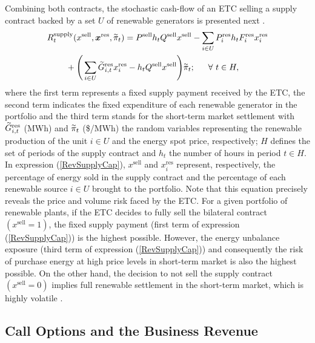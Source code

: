 	Combining both contracts, the stochastic cash-flow of an ETC selling a supply contract backed by a set $U$ of renewable generators is presented next \cite{RobustSpotPrice}.
%
\begin{align}
	& R^{\text{supply}}_{t}(x^{\text{sell}}, \boldsymbol{x}^{\text{res}}, \accentset{\sim}{\pi}_{t}) = P^{\text{sell}} h_{t} Q^{\text{sell}} x^{\text{sell}} - \sum_{i \in U} P_{i}^{\text{res}} h_{t} F_{i}^{\text{res}} x_{i}^{\text{res}} \notag \\
	 		& \> \> \> \> \> \> \> \> \> \> + \Bigg( \sum_{i \in U} \accentset{\sim}{G}_{i,t}^{\text{res}} x_{i}^{\text{res}} - h_{t} Q^{\text{sell}} x^{\text{sell}} \Bigg)\accentset{\sim}{\pi}_{t}; \> \> \> \> \> \> \> \forall ~ t \in H, \label{RevSupplyCap}
\end{align}
%
where the first term represents a fixed supply payment received by the ETC, the second term indicates the fixed expenditure of each renewable generator in the portfolio and the third term stands for the short-term market settlement with $\accentset{\sim}{G}_{i,t}^{\text{res}}$ (MWh) and $\accentset{\sim}{\pi}_{t}$ (\$/MWh) the random variables representing the renewable production of the unit $i \in U$ and the energy spot price, respectively; $H$ defines the set of periods of the supply contract and $h_{t}$ the number of hours in period $t \in H$. In expression (\ref{RevSupplyCap}), $x^{\text{sell}}$ and $x_{i}^{\text{res}}$ represent, respectively, the percentage of energy sold in the supply contract and the percentage of each renewable source $i \in U$ brought to the portfolio. Note that this equation precisely reveals the price and volume risk faced by the ETC. For a given portfolio of renewable plants, if the ETC decides to fully sell the bilateral contract $(x^{\text{sell}} = 1)$, the fixed supply payment (first term of expression (\ref{RevSupplyCap})) is the highest possible. However, the energy unbalance exposure (third term of expression (\ref{RevSupplyCap})) and consequently the risk of purchase energy at high price levels in short-term market is also the highest possible. On the other hand, the decision to not sell the supply contract $(x^{\text{sell}} = 0)$ implies full renewable settlement in the short-term market, which is highly volatile \cite{SupplyAdequacy}.

\subsection{Call Options and the Business Revenue}

